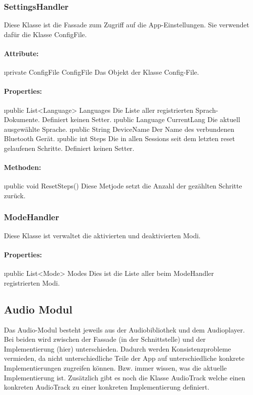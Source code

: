 \documentclass[../entwurf.tex]{subfiles}
\begin{document}
			\subsubsection{SettingsHandler}
				Diese Klasse ist die Fassade zum Zugriff auf die App-Einstellungen. Sie verwendet dafür die Klasse ConfigFile.
				\paragraph{Attribute:}
					\begin{itemize}
						\i{private ConfigFile ConfigFile} Das Objekt der Klasse Config-File.
					\end{itemize}
				\paragraph{Properties:}
					\begin{itemize}
						\i{public List<Language> Languages} Die Liste aller registrierten Sprach-Dokumente. Definiert keinen Setter.
						\i{public Language CurrentLang} Die aktuell ausgewählte Sprache.
						\i{public String DeviceName} Der Name des verbundenen Bluetooth Gerät.
						\i{public int Steps} Die in allen Sessions seit dem letzten reset gelaufenen Schritte. Definiert keinen Setter.
					\end{itemize}
				\paragraph{Methoden:}
					\begin{itemize}
						\i{public void ResetSteps()} Diese Metjode setzt die Anzahl der gezählten Schritte zurück.
					\end{itemize}
			\subsubsection{ModeHandler}
				Diese Klasse ist verwaltet die aktivierten und deaktivierten Modi.
				\paragraph{Properties:}
					\begin{itemize}
						\i{public List<Mode> Modes} Dies ist die Liste aller beim ModeHandler registrierten Modi.
					\end{itemize}
		\subsection{Audio Modul}
			Das Audio-Modul besteht jeweils aus der Audiobibliothek und dem Audioplayer.
			Bei beiden wird zwischen der Fassade (in der Schnittstelle) und der Implementierung (hier) unterschieden.
			Dadurch werden Konsistenzprobleme vermieden, da nicht unterschiedliche Teile der App auf unterschiedliche konkrete Implementierungen
			zugreifen können. Bzw. immer wissen, was die aktuelle Implementierung ist.
			Zusätzlich gibt es noch die Klasse AudioTrack welche einen konkreten AudioTrack zu einer konkreten Implementierung definiert.
\end{document}
